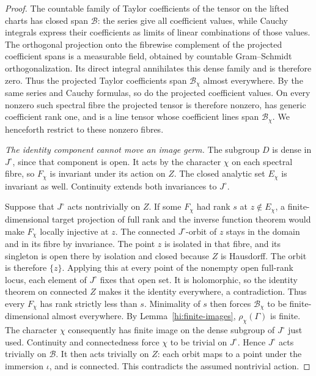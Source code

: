 \begin{proof}
The countable family of Taylor coefficients of the tensor on the
lifted charts has closed span \(\mathcal B\): the series give all
coefficient values, while Cauchy integrals express their coefficients
as limits of linear combinations of those values. The orthogonal
projection onto the fibrewise complement of the projected coefficient
spans is a measurable field, obtained by countable Gram--Schmidt
orthogonalization. Its direct integral annihilates this dense family
and is therefore zero. Thus the projected Taylor coefficients span
\(\mathcal B_\chi\) almost everywhere. By the same series and Cauchy
formulas, so do the projected coefficient values. On every nonzero
such spectral fibre the projected tensor is therefore nonzero,
has generic coefficient rank one, and is a line tensor whose
coefficient lines span \(\mathcal B_\chi\). We henceforth restrict
to these nonzero fibres.

\medskip\noindent\emph{The identity component cannot move an image germ.}
The subgroup \(D\) is dense in \(J^\circ\), since that component is open.
It acts by the character \(\chi\) on each spectral fibre, so
\(F_\chi\) is invariant under its action on \(Z\).
The closed analytic set \(E_\chi\) is invariant as well.
Continuity extends both invariances to \(J^\circ\).

Suppose that \(J^\circ\) acts nontrivially on \(Z\). If some
\(F_\chi\) had rank \(s\) at \(z\notin E_\chi\), a finite-dimensional
target projection of full rank and the inverse function theorem
would make \(F_\chi\) locally injective at \(z\). The connected
\(J^\circ\)-orbit of \(z\) stays in the domain and in its fibre by
invariance. The point \(z\) is isolated in that fibre, and its
singleton is open there by isolation and closed because \(Z\) is Hausdorff.
The orbit is therefore \(\{z\}\). Applying this at every point of
the nonempty open full-rank locus, each element of \(J^\circ\)
fixes that open set. It is holomorphic, so the identity theorem on
connected \(Z\) makes it the identity everywhere, a contradiction.
Thus every \(F_\chi\) has rank strictly less than \(s\).
Minimality of \(s\) then forces
\(\mathcal B_\chi\) to be finite-dimensional almost everywhere.
By Lemma~\ref{hi:finite-images}, \(\rho_\chi(\Gamma)\) is finite.
The character \(\chi\) consequently has finite image on the dense
subgroup of \(J^\circ\) just used. Continuity and connectedness
force \(\chi\) to be trivial on \(J^\circ\).
Hence \(J^\circ\) acts trivially on \(\mathcal B\).
It then acts trivially on \(Z\): each orbit maps to a point under
the immersion \(\iota\), and is connected. This contradicts the
assumed nontrivial action.


\end{proof}
